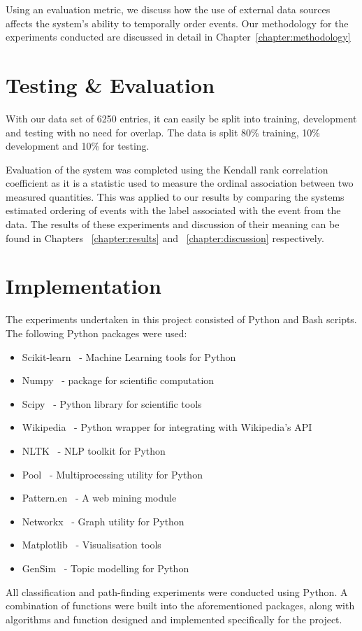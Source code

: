 \documentclass[bsc,frontabs,twoside,singlespacing,parskip,deptreport]{infthesis}     %
\begin{document}
Using an evaluation metric, we discuss how the use of external data sources affects the system's ability to
temporally order events. Our methodology for the experiments conducted are discussed in detail in Chapter~\ref{chapter:methodology}

\section{Testing \& Evaluation}
With our data set of 6250 entries, it can
easily be split into training, development and testing with no
need for overlap. The data is split 80\% training,
10\% development and 10\% for testing.

Evaluation of the system was completed using the
Kendall rank correlation coefficient as it is a statistic
used to measure the ordinal association between two
measured quantities. This was applied to our results
by comparing the systems estimated ordering of events
with the label associated with the event from the data.
The results of these experiments and discussion of their meaning can be found in Chapters ~\ref{chapter:results} and ~\ref{chapter:discussion} respectively. 

\section{Implementation}
The experiments undertaken in this project consisted of Python and Bash scripts.
The following Python packages were used:
\begin{itemize}
\item Scikit-learn~\cite{scikit-learn} - Machine Learning tools for Python
\item Numpy~\cite{numpy} - package for scientific computation
\item Scipy~\cite{scipy} - Python library for scientific tools
\item Wikipedia~\cite{wikipediaAPI} - Python wrapper for integrating with Wikipedia's API
\item NLTK~\cite{nltk} - NLP toolkit for Python
\item Pool~\cite{pool} - Multiprocessing utility for Python
\item Pattern.en~\cite{pattern} - A web mining module 
\item Networkx~\cite{networkx} - Graph utility for Python
\item Matplotlib~\cite{matplotlib} - Visualisation tools
\item GenSim~\cite{rehurek_lrec} - Topic modelling for Python 
\end{itemize}
All classification and path-finding experiments were conducted using Python. A combination of
functions were built into the aforementioned packages, along with algorithms and function designed and implemented
specifically for the project.
\end{document}

